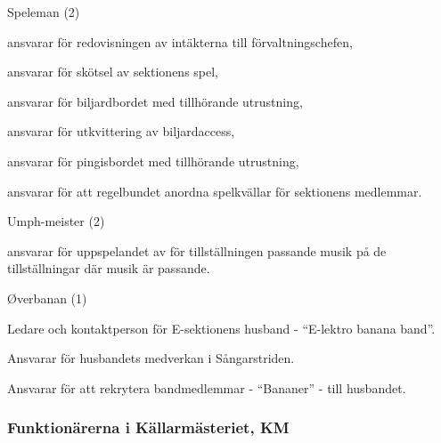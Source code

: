 \documentclass[10pt]{article}
\begin{document}
\begin{emptylist}
\begin{dashlist}
        \end{dashlist}
    \item Speleman (2)
        \begin{dashlist}
            \item ansvarar för redovisningen av intäkterna till
                förvaltningschefen,
            \item ansvarar för skötsel av sektionens spel,
            \item ansvarar för biljardbordet med tillhörande utrustning,
            \item ansvarar för utkvittering av biljardaccess,
            \item ansvarar för pingisbordet med tillhörande utrustning,
            \item ansvarar för att regelbundet anordna spelkvällar för sektionens medlemmar.
        \end{dashlist}
    \item Umph-meister (2)
        \begin{dashlist}
        \item ansvarar för uppspelandet av för tillställningen passande
            musik på de tillställningar där musik är passande.
        \end{dashlist}
    \item Øverbanan (1)
    \begin{dashlist}
    \item Ledare och kontaktperson för E-sektionens husband - “E-lektro banana band”.
    \item Ansvarar för husbandets medverkan i Sångarstriden.
    \item Ansvarar för att rekrytera bandmedlemmar - “Bananer” - till husbandet.
    \end{dashlist}
\end{emptylist}

\subsubsection{Funktionärerna i Källarmästeriet, KM}
\end{document}
